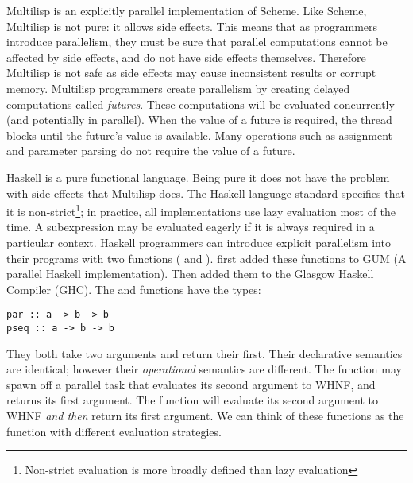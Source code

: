 Multilisp \citep*{halstead:1984:multilisp,halstead:1985:multilisp} is an
explicitly parallel implementation of Scheme.
Like Scheme, Multilisp is not pure: it allows side effects.
This means that as programmers introduce parallelism, they must be sure that
parallel computations cannot be affected by side effects,
and do not have side effects themselves.
Therefore Multilisp is not safe as side effects may cause inconsistent
results or corrupt memory.
Multilisp programmers create parallelism by creating delayed computations
called \emph{futures}.
These computations will be evaluated concurrently
(and potentially in parallel).
When the value of a future is required,
the thread blocks until the future's value is available.
Many operations such as assignment and parameter parsing do not require the
value of a future.

Haskell is a pure functional language.
Being pure it does not have the problem with side effects that Multilisp
does.
The Haskell language standard specifies that it is non-strict\footnote{
    Non-strict evaluation is more broadly defined than lazy evaluation};
in practice, all implementations use lazy evaluation most of the time.
A subexpression may be evaluated eagerly if it is always required in a
particular context.
Haskell programmers can introduce explicit parallelism into their programs
with two functions ( and ).
\citet{gph:gum}
first added these functions to GUM (A parallel Haskell implementation).
Then \citet{harris:2005:haskell-smp} added them to the
Glasgow Haskell Compiler (GHC).
The  and  functions have the types:

\begin{verbatim}
par :: a -> b -> b
pseq :: a -> b -> b
\end{verbatim}
They both take two arguments and return their first.
Their declarative semantics are identical;
however their \emph{operational} semantics are different.
The  function may spawn off a parallel task that evaluates its
second argument to WHNF,
and returns its first argument.
The  function will evaluate its second argument to WHNF
\emph{and then} return its first argument.
We can think of these functions as the  function
with different evaluation strategies.

